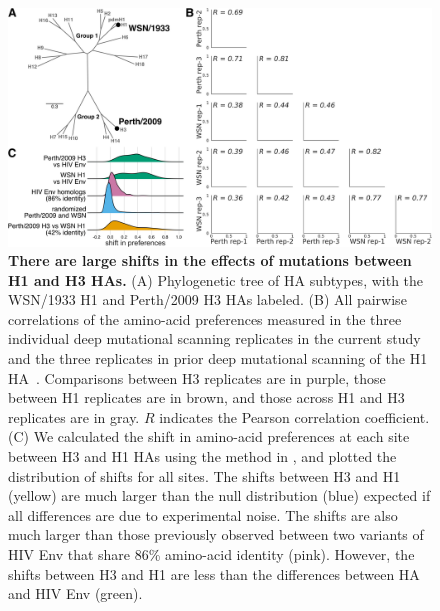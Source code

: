 \documentclass[9pt,twocolumn,twoside]{pnas-new}
\begin{document}
\begin{figure}
\centering
\includegraphics[width=12cm]{figs/distance_distribution/distance_distribution.pdf}
\caption{\label{fig:distance_distribution}
{\bf There are large shifts in the effects of mutations between H1 and H3 HAs.}
(A) Phylogenetic tree of HA subtypes, with the WSN/1933 H1 and Perth/2009 H3 HAs labeled.
(B) All pairwise correlations of the amino-acid preferences measured in the three individual deep mutational scanning replicates in the current study and the three replicates in prior deep mutational scanning of the H1 HA~\cite{doud2016accurate}.
Comparisons between H3 replicates are in purple, those between H1 replicates are in brown, and those across H1 and H3 replicates are in gray.
$R$ indicates the Pearson correlation coefficient.
(C) We calculated the shift in amino-acid preferences at each site between H3 and H1 HAs using the method in \cite{haddox2018mapping}, and plotted the distribution of shifts for all sites.
The shifts between H3 and H1 (yellow) are much larger than the null distribution (blue) expected if all differences are due to experimental noise.
The shifts are also much larger than those previously observed between two variants of HIV Env that share 86\% amino-acid identity (pink).
However, the shifts between H3 and H1 are less than the differences between HA and HIV Env (green).
}
\end{figure}
\end{document}
